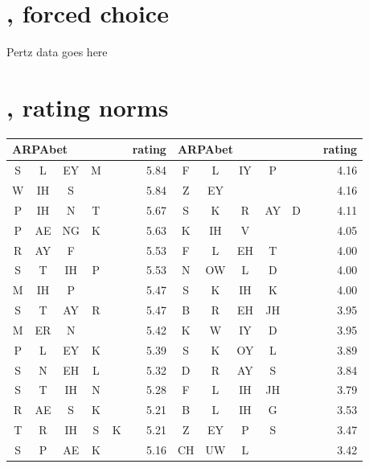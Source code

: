 \section{\citet{Pertz1975}, forced choice}

Pertz data goes here

\section{\citet{Albright2003b}, rating norms}

\begin{center}
\begin{longtable}{c@{ } c@{ } c@{ } c@{ } c r | c@{ } c@{ } c@{ } c@{ } c@{ } c r }
\toprule
\multicolumn{5}{l}{ARPAbet} & rating & \multicolumn{6}{l}{ARPAbet} & rating \\ 
\midrule
S  & L  & EY & M  &         & 5.84  & F  & L  & IY & P  &    &     & 4.16 \\
W  & IH & S  &    &         & 5.84  & Z  & EY &    &    &    &     & 4.16 \\
P  & IH & N  & T  &         & 5.67  & S  & K  & R  & AY & D  &     & 4.11 \\
P  & AE & NG & K  &         & 5.63  & K  & IH & V  &    &    &     & 4.05 \\
R  & AY & F  &    &         & 5.53  & F  & L  & EH & T  &    &     & 4.00 \\
S  & T  & IH & P  &         & 5.53  & N  & OW & L  & D  &    &     & 4.00 \\
M  & IH & P  &    &         & 5.47  & S  & K  & IH & K  &    &     & 4.00 \\
S  & T  & AY & R  &         & 5.47  & B  & R  & EH & JH &    &     & 3.95 \\
M  & ER & N  &    &         & 5.42  & K  & W  & IY & D  &    &     & 3.95 \\
P  & L  & EY & K  &         & 5.39  & S  & K  & OY & L  &    &     & 3.89 \\
S  & N  & EH & L  &         & 5.32  & D  & R  & AY & S  &    &     & 3.84 \\
S  & T  & IH & N  &         & 5.28  & F  & L  & IH & JH &    &     & 3.79 \\
R  & AE & S  & K  &         & 5.21  & B  & L  & IH & G  &    &     & 3.53 \\
T  & R  & IH & S  & K       & 5.21  & Z  & EY & P  & S  &    &     & 3.47 \\
S  & P  & AE & K  &         & 5.16  & CH & UW & L  &    &    &     & 3.42 \\ 

\end{longtable}
\end{center}
